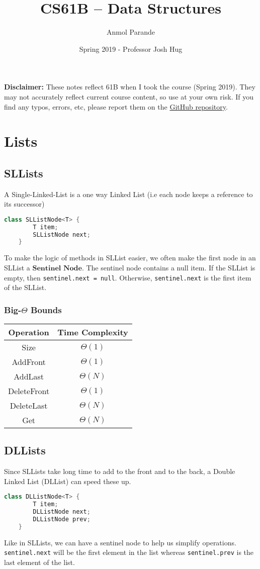 \documentclass{article}
\begin{document}
    \title{CS61B -- Data Structures}
    \author{Anmol Parande}
    \date{Spring 2019 - Professor Josh Hug}
\maketitle
\tableofcontents
\textbf{Disclaimer: }These notes reflect 61B when I took the course (Spring 2019). They may not accurately reflect current course content, so use at your own risk.
If you find any typos, errors, etc, please report them on the \href{https://github.com/parandea17/BerkeleyNotes}{GitHub repository}.\\
\section{Lists}
\subsection{SLLists}
A Single-Linked-List is a one way Linked List (i.e each node keeps a reference to its successor)
\begin{lstlisting}[language=Java]
    class SLListNode<T> {
        T item;
        SLListNode next;
    }
\end{lstlisting}
To make the logic of methods in SLList easier, we often make the first node in an SLList a $\textbf{Sentinel Node}$.
The sentinel node contains a null item. If the SLList is empty, then \lstinline{sentinel.next = null}.
Otherwise, \lstinline{sentinel.next} is the first item of the SLList.
\subsubsection{Big-$\Theta$ Bounds}
\begin{center}
    \begin{tabular}{ c | c }
     Operation & Time Complexity\\
     \hline
     Size & $\Theta(1)$\\ 
     AddFront & $\Theta(1)$\\  
     AddLast & $\Theta(N)$\\
     DeleteFront & $\Theta(1)$\\
     DeleteLast & $\Theta(N)$\\
     Get & $\Theta(N)$
    \end{tabular}
\end{center}
\subsection{DLLists}
Since SLLists take long time to add to the front and to the back, a Double Linked List (DLList) can speed these up.
\begin{lstlisting}[language=Java]
    class DLListNode<T> {
        T item;
        DLListNode next;
        DLListNode prev;
    }
\end{lstlisting}
Like in SLLists, we can have a sentinel node to help us simplify operations.
\lstinline{sentinel.next} will be the first element in the list whereas \lstinline{sentinel.prev} is the last element of the list.
\end{document}
